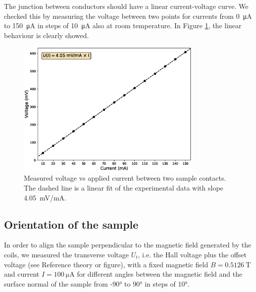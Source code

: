 \documentclass[11pt,a4paper]{article}
\begin{document}
The junction between conductors should have a linear current-voltage curve. We checked this by measuring the voltage between two points for currents from \SI{0}{\micro\ampere} to \SI{150}{\micro\ampere} in steps of \SI{10}{\micro\ampere} also at room temperature. In Figure \ref{fig:ohmic_check}, the linear behaviour is clearly showed.

\begin{figure}[H]
\centering
\includegraphics[width=0.8\textwidth]{Voltage_vs_current_ohmic_test.eps}
\caption{Measured voltage vs applied current between two sample contacts. The dashed line is a linear fit of the experimental data with slope \SI{4.05}{\milli\volt/\milli\ampere}.}
\label{fig:ohmic_check}
\end{figure}

\subsection{Orientation of the sample}

In order to align the sample perpendicular to the magnetic field generated by the coils, we measured the transverse voltage $U_t$, i.e. the Hall voltage plus the offset voltage (see {\color{red}Reference theory or figure}), with a fixed magnetic field $B=\SI{0.5126}{\tesla}$ and current $I=\SI{100}{\micro\ampere}$ for different angles between the magnetic field and the surface normal of the sample from \ang{-90} to \ang{90} in steps of \ang{10}.
\end{document}
